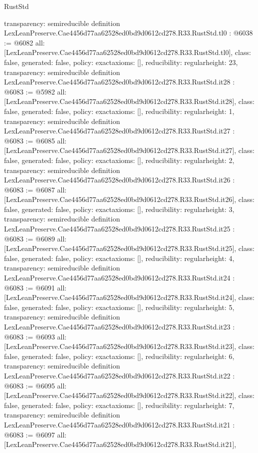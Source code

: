 \begin{lexlean}{RustStd}
\begin{coremodule}
{  transparency: semireducible
}
definition LexLeanPreserve.Cae4456d77aa62528ed0bd9d0612cd278.R33.RustStd.tl0 : @6038 := @6082 {
  all: [LexLeanPreserve.Cae4456d77aa62528ed0bd9d0612cd278.R33.RustStd.tl0],
  class: false,
  generated: false,
  policy: exact{axioms: []},
  reducibility: regular{height: 23},
  transparency: semireducible
}
definition LexLeanPreserve.Cae4456d77aa62528ed0bd9d0612cd278.R33.RustStd.it28 : @6083 := @5982 {
  all: [LexLeanPreserve.Cae4456d77aa62528ed0bd9d0612cd278.R33.RustStd.it28],
  class: false,
  generated: false,
  policy: exact{axioms: []},
  reducibility: regular{height: 1},
  transparency: semireducible
}
definition LexLeanPreserve.Cae4456d77aa62528ed0bd9d0612cd278.R33.RustStd.it27 : @6083 := @6085 {
  all: [LexLeanPreserve.Cae4456d77aa62528ed0bd9d0612cd278.R33.RustStd.it27],
  class: false,
  generated: false,
  policy: exact{axioms: []},
  reducibility: regular{height: 2},
  transparency: semireducible
}
definition LexLeanPreserve.Cae4456d77aa62528ed0bd9d0612cd278.R33.RustStd.it26 : @6083 := @6087 {
  all: [LexLeanPreserve.Cae4456d77aa62528ed0bd9d0612cd278.R33.RustStd.it26],
  class: false,
  generated: false,
  policy: exact{axioms: []},
  reducibility: regular{height: 3},
  transparency: semireducible
}
definition LexLeanPreserve.Cae4456d77aa62528ed0bd9d0612cd278.R33.RustStd.it25 : @6083 := @6089 {
  all: [LexLeanPreserve.Cae4456d77aa62528ed0bd9d0612cd278.R33.RustStd.it25],
  class: false,
  generated: false,
  policy: exact{axioms: []},
  reducibility: regular{height: 4},
  transparency: semireducible
}
definition LexLeanPreserve.Cae4456d77aa62528ed0bd9d0612cd278.R33.RustStd.it24 : @6083 := @6091 {
  all: [LexLeanPreserve.Cae4456d77aa62528ed0bd9d0612cd278.R33.RustStd.it24],
  class: false,
  generated: false,
  policy: exact{axioms: []},
  reducibility: regular{height: 5},
  transparency: semireducible
}
definition LexLeanPreserve.Cae4456d77aa62528ed0bd9d0612cd278.R33.RustStd.it23 : @6083 := @6093 {
  all: [LexLeanPreserve.Cae4456d77aa62528ed0bd9d0612cd278.R33.RustStd.it23],
  class: false,
  generated: false,
  policy: exact{axioms: []},
  reducibility: regular{height: 6},
  transparency: semireducible
}
definition LexLeanPreserve.Cae4456d77aa62528ed0bd9d0612cd278.R33.RustStd.it22 : @6083 := @6095 {
  all: [LexLeanPreserve.Cae4456d77aa62528ed0bd9d0612cd278.R33.RustStd.it22],
  class: false,
  generated: false,
  policy: exact{axioms: []},
  reducibility: regular{height: 7},
  transparency: semireducible
}
definition LexLeanPreserve.Cae4456d77aa62528ed0bd9d0612cd278.R33.RustStd.it21 : @6083 := @6097 {
  all: [LexLeanPreserve.Cae4456d77aa62528ed0bd9d0612cd278.R33.RustStd.it21],
}
\end{coremodule}
\end{lexlean}
